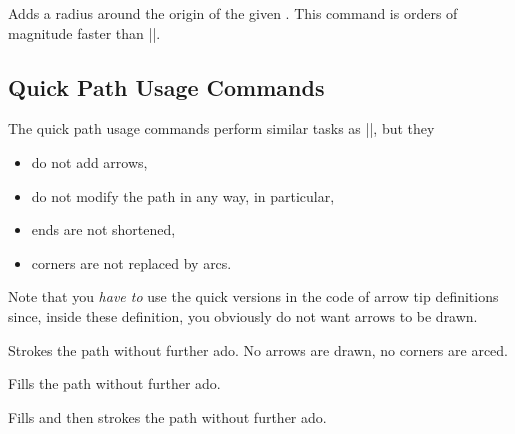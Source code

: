 \begin{command}{\pgfpathqcircle{}}
    Adds a radius around the origin of the given . This command is
    orders of magnitude faster than ||.
\begin{codeexample}[pre={\colorlet{examplefill}{yellow!80!black}}]
\end{codeexample}
\end{command}


\subsection{Quick Path Usage Commands}

The quick path usage commands perform similar tasks as |\pgfusepath|, but they
%
\begin{itemize}
    \item do not add arrows,
    \item do not modify the path in any way, in particular,
    \item ends are not shortened,
    \item corners are not replaced by arcs.
\end{itemize}

Note that you \emph{have to} use the quick versions in the code of arrow tip
definitions since, inside these definition, you obviously do not want arrows to
be drawn.

\begin{command}{\pgfusepathqstroke}
    Strokes the path without further ado. No arrows are drawn, no corners are
    arced.
\begin{codeexample}[]
\begin{pgfpicture}
  \pgfpathqcircle{5pt}
  \pgfusepathqstroke
\end{pgfpicture}
\end{codeexample}
\end{command}

\begin{command}{\pgfusepathqfill}
    Fills the path without further ado.
\end{command}

\begin{command}{\pgfusepathqfillstroke}
    Fills and then strokes the path without further ado.
\end{command}

